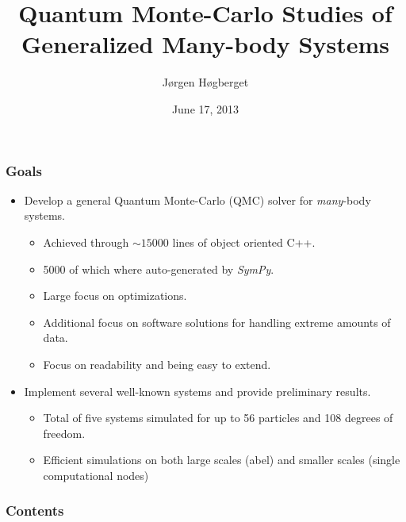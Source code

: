 \documentclass{beamer}
\title[Master Presentation]{Quantum Monte-Carlo Studies of Generalized Many-body Systems}
\author{Jørgen Høgberget}
\date{June 17, 2013}
\begin{document}
\begin{frame}
\titlepage
\end{frame}

\begin{frame}
 \frametitle{Goals}
  \begin{itemize}
   \item Develop a general Quantum Monte-Carlo (QMC) solver for \emph{many}-body systems. 
   \begin{itemize}
      \pause \item Achieved through $\sim 15000$ lines of object oriented C++.
      \pause \item 5000 of which where auto-generated by \textit{SymPy}.
      \pause \item Large focus on optimizations. 
      \pause \item Additional focus on software solutions for handling extreme amounts of data.
      \pause \item Focus on readability and being easy to extend. 
   \end{itemize}
  \end{itemize}
  \begin{itemize}
   \pause \item Implement several well-known systems and provide preliminary results.
   \begin{itemize}
      \pause \item Total of five systems simulated for up to 56 particles and 108 degrees of freedom.
      \pause \item Efficient simulations on both large scales (abel) and smaller scales (single computational nodes)
   \end{itemize}
  \end{itemize}
   


  
\end{frame}

\begin{frame}
 \frametitle{Contents}
 \tableofcontents[hideallsubsections]
\end{frame}





\end{document}
